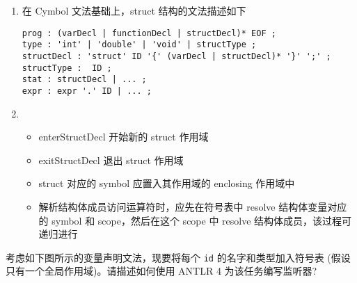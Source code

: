 \documentclass[a4paper, justified]{tufte-handout}
\begin{document}
\begin{solution}
	\begin{enumerate}[(1)]
		\item
			在 Cymbol 文法基础上，struct 结构的文法描述如下
			\begin{lstlisting}
prog : (varDecl | functionDecl | structDecl)* EOF ;
type : 'int' | 'double' | 'void' | structType ;
structDecl : 'struct' ID '{' (varDecl | structDecl)* '}' ';' ;
structType :  ID ;
stat : structDecl | ... ;
expr : expr '.' ID | ... ;
			\end{lstlisting}
		\item
			\begin{itemize}
				\item enterStructDecl 开始新的 struct 作用域
				\item exitStructDecl 退出 struct 作用域
				\item struct 对应的 symbol 应置入其作用域的 enclosing 作用域中
				\item 解析结构体成员访问运算符时，应先在符号表中 resolve 结构体变量对应的 symbol 和 scope，然后在这个
				scope 中 resolve 结构体成员，该过程可递归进行
			\end{itemize}

	\end{enumerate}
\end{solution}

\pagebreak
\begin{problem}
  考虑如下图所示的变量声明文法，现要将每个 \texttt{id} 的名字和类型加入符号表
  (假设只有一个全局作用域)。请描述如何使用 ANTLR 4 为该任务编写监听器?
\end{problem}
\end{document}
